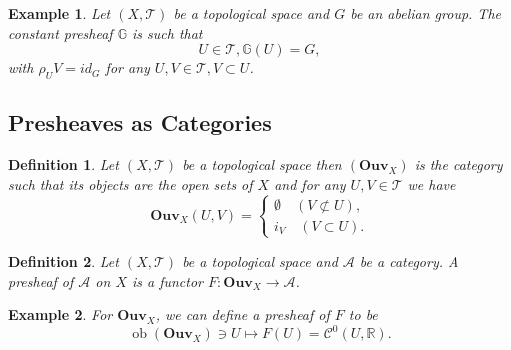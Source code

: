 \documentclass{article}
\newtheorem{definition}{Definition}[section]
\newtheorem{example}{Example}[section]
\numberwithin{equation}{section}
\DeclareMathOperator{\ob}{ob}
\begin{document}
\begin{example}
Let $(X,\mathcal{T})$ be a topological space and $G$ be an abelian group. The constant presheaf $\mathbb{G}$ is such that 
\begin{equation*}
U\in\mathcal{T}, \mathbb{G}(U) = G,
\end{equation*}
with $\rho_UV=id_G$ for any $U,V\in\mathcal{T},V\subset U$. 
\end{example}

\subsection{Presheaves as Categories}

\begin{definition}
Let $(X,\mathcal{T})$ be a topological space then $(\mathbf{Ouv}_X)$ is the category such that its objects are the open sets of $X$ and for any $U,V\in\mathcal{T}$ we have
\begin{equation*}
\mathbf{Ouv}_X(U,V)=
\begin{cases}
\emptyset \quad (V\not\subset U),\\
i_V \quad (V\subset U).
\end{cases}
\end{equation*}
\end{definition}

\begin{definition}
Let $(X,\mathcal{T})$ be a topological space and $\mathcal{A}$ be a category. A presheaf of $\mathcal{A}$ on $X$ is a functor $F:\mathbf{Ouv}_X\to\mathcal{A}$.
\end{definition}

\begin{example}
For $\mathbf{Ouv}_X$, we can define a presheaf of $F$ to be
\begin{equation*}
\ob(\mathbf{Ouv}_X)\ni U\mapsto F(U) = \mathcal{C}^0(U,\mathbb{R}).
\end{equation*}
\end{example}
\end{document}
